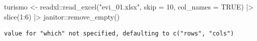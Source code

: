 \documentclass[
  letterpaper,
  DIV=11,
  numbers=noendperiod]{scrartcl}
\newenvironment{Shaded}{}{}
\newcommand{\AttributeTok}[1]{\textcolor[rgb]{0.65,0.15,0.64}{#1}}
\newcommand{\ConstantTok}[1]{\textcolor[rgb]{0.60,0.41,0.00}{#1}}
\newcommand{\DecValTok}[1]{\textcolor[rgb]{0.60,0.41,0.00}{#1}}
\newcommand{\FunctionTok}[1]{\textcolor[rgb]{0.25,0.47,0.95}{#1}}
\newcommand{\NormalTok}[1]{\textcolor[rgb]{0.22,0.23,0.26}{#1}}
\newcommand{\OtherTok}[1]{\textcolor[rgb]{0.15,0.68,0.38}{#1}}
\newcommand{\SpecialCharTok}[1]{\textcolor[rgb]{0.00,0.52,0.74}{#1}}
\newcommand{\StringTok}[1]{\textcolor[rgb]{0.31,0.63,0.31}{#1}}
\begin{document}
\begin{Shaded}
\begin{Highlighting}[]
\NormalTok{turismo }\OtherTok{\textless{}{-}}\NormalTok{ readxl}\SpecialCharTok{::}\FunctionTok{read\_excel}\NormalTok{(}\StringTok{"evi\_01.xlsx"}\NormalTok{, }\AttributeTok{skip =} \DecValTok{10}\NormalTok{, }\AttributeTok{col\_names =} \ConstantTok{TRUE}\NormalTok{) }\SpecialCharTok{|\textgreater{}} 
  \FunctionTok{slice}\NormalTok{(}\DecValTok{1}\SpecialCharTok{:}\DecValTok{6}\NormalTok{) }\SpecialCharTok{|\textgreater{}} 
\NormalTok{  janitor}\SpecialCharTok{::}\FunctionTok{remove\_empty}\NormalTok{()}
\end{Highlighting}
\end{Shaded}

\begin{verbatim}
value for "which" not specified, defaulting to c("rows", "cols")
\end{verbatim}
\end{document}
